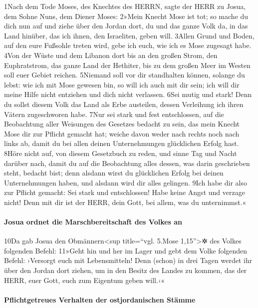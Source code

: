 1Nach dem Tode Moses, des Knechtes des HERRN, sagte der HERR zu Josua,
dem Sohne Nuns, dem Diener Moses: 2»Mein Knecht Mose ist tot; so mache
du dich nun auf und ziehe über den Jordan dort, du und das ganze Volk
da, in das Land hinüber, das ich ihnen, den Israeliten, geben will.
3Allen Grund und Boden, auf den eure Fußsohle treten wird, gebe ich
euch, wie ich es Mose zugesagt habe. 4Von der Wüste und dem Libanon dort
bis an den großen Strom, den Euphratstrom, das ganze Land der Hethiter,
bis zu dem großen Meer im Westen soll euer Gebiet reichen. 5Niemand soll
vor dir standhalten können, solange du lebst: wie ich mit Mose gewesen
bin, so will ich auch mit dir sein; ich will dir meine Hilfe nicht
entziehen und dich nicht verlassen. 6Sei mutig und stark! Denn du sollst
diesem Volk das Land als Erbe austeilen, dessen Verleihung ich ihren
Vätern zugeschworen habe. 7Nur sei stark und fest entschlossen, auf die
Beobachtung aller Weisungen des Gesetzes bedacht zu sein, das mein
Knecht Mose dir zur Pflicht gemacht hat; weiche davon weder nach rechts
noch nach links ab, damit du bei allen deinen Unternehmungen glücklichen
Erfolg hast. 8Höre nicht auf, von diesem Gesetzbuch zu reden, und sinne
Tag und Nacht darüber nach, damit du auf die Beobachtung alles dessen,
was darin geschrieben steht, bedacht bist; denn alsdann wirst du
glücklichen Erfolg bei deinen Unternehmungen haben, und alsdann wird dir
alles gelingen. 9Ich habe dir also zur Pflicht gemacht: Sei stark und
entschlossen! Habe keine Angst und verzage nicht! Denn mit dir ist der
HERR, dein Gott, bei allem, was du unternimmst.«

\hypertarget{josua-ordnet-die-marschbereitschaft-des-volkes-an}{%
\paragraph{Josua ordnet die Marschbereitschaft des Volkes
an}\label{josua-ordnet-die-marschbereitschaft-des-volkes-an}}

10Da gab Josua den Obmännern\textless sup title=``vgl. 5.Mose
1,15''\textgreater✲ des Volkes folgenden Befehl: 11»Geht hin und her im
Lager und gebt dem Volke folgenden Befehl: ›Versorgt euch mit
Lebensmitteln! Denn (schon) in drei Tagen werdet ihr über den Jordan
dort ziehen, um in den Besitz des Landes zu kommen, das der HERR, euer
Gott, euch zum Eigentum geben will.‹«

\hypertarget{pflichtgetreues-verhalten-der-ostjordanischen-stuxe4mme}{%
\paragraph{Pflichtgetreues Verhalten der ostjordanischen
Stämme}\label{pflichtgetreues-verhalten-der-ostjordanischen-stuxe4mme}}

